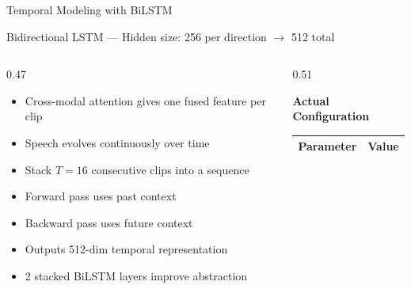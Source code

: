 \documentclass[aspectratio=169, 10pt]{beamer}
\begin{document}
\begin{frame}{Temporal Modeling with BiLSTM}

\textcolor{NavyBlue}{\footnotesize
Bidirectional LSTM --- Hidden size: 256 per direction $\rightarrow$ 512 total}

\vspace{3pt}

\small

\begin{columns}[T,onlytextwidth]

\begin{column}{0.47\textwidth}

\begin{tcolorbox}[
bluecard,
title={\small Why Temporal Modeling?},
boxsep=2pt,
left=3pt,right=3pt,
top=3pt,bottom=3pt]

\footnotesize
\begin{itemize}[leftmargin=*, itemsep=1pt]
  \item Cross-modal attention gives one fused feature per clip
  \item Speech evolves continuously over time
  \item Stack $T=16$ consecutive clips into a sequence
  \item Forward pass uses past context
  \item Backward pass uses future context
  \item Outputs 512-dim temporal representation
  \item 2 stacked BiLSTM layers improve abstraction
\end{itemize}

\end{tcolorbox}

\end{column}

\begin{column}{0.51\textwidth}

\textcolor{NavyBlue}{\small\bfseries Actual Configuration}

\vspace{2pt}

\scriptsize

\begin{tabular}{@{}p{2.8cm}p{3.8cm}@{}}
\toprule

\rowcolor{NavyBlue}
\color{white}\bfseries Parameter &
\color{white}\bfseries Value \\

\midrule


\end{tabular}
\end{column}
\end{columns}
\end{frame}
\end{document}
